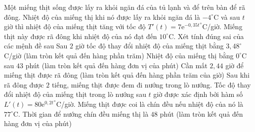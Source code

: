 \begin{ex}%
Một miếng thịt sống được lấy ra khỏi ngăn đá của tủ lạnh và để trên bàn để rã đông. Nhiệt độ của miếng thị khi nó được lấy ra khỏi ngăn đá là $-4^\circ$C và sau $t$ giờ thì nhiệt độ của miếng thịt tăng với tốc độ $T'(t)=7{\mathrm{e}^{-0{,}35t}}^\circ$C/giờ. Miếng thịt này được rã đông khi nhiệt độ của nó đạt đến $10^\circ$C. Xét tính đúng sai của các mệnh đề sau
\choiceTF
{\True Sau $2$ giờ tốc độ thay đổi nhiệt độ của miếng thịt bằng $3{,}48^\circ$C/giờ (làm tròn kết quả đến hàng phần trăm)}
{Nhiệt độ của miếng thị bằng $0^\circ$C sau $43$ phút (làm tròn kết quả đến hàng đơn vị của phút)}
{Cần mất $2{,}44$ giờ để miếng thịt được rã đông (làm tròn kết quả đến hàng phần trăm của giờ)}
{Sau khi rã đông được $2$ tiếng, miếng thịt được đem đi nướng trong lò nướng. Tốc độ thay đổi nhiệt độ của miếng thịt trong lò nướng sau $t$ giờ được xác định bởi hàm số\break $L'(t)=80{\mathrm{e}^{0{,}2t}}^\circ$C/giờ. Miếng thịt được coi là chín đều nếu nhiệt độ của nó là $77^\circ$C. Thời gian để nướng chín đều miếng thị là $48$ phút (làm tròn kết quả đến hàng đơn vị của phút)}
\end{ex}
